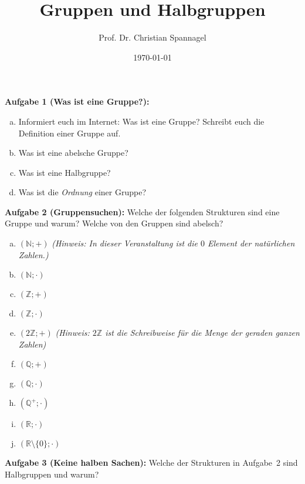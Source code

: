 \documentclass{../cssheet}
\title{Gruppen und Halbgruppen}
\author{Prof. Dr. Christian Spannagel}
\date{\today}
\begin{document}
\printtitle

\vspace*{10mm}

\textbf{Aufgabe 1 (Was ist eine Gruppe?):} 
\begin{enumerate}[a)]
\item Informiert euch im Internet: Was ist eine Gruppe? Schreibt euch die Definition einer Gruppe auf. 
\item Was ist eine abelsche Gruppe?
\item Was ist eine Halbgruppe?
\item Was ist die \emph{Ordnung} einer Gruppe?
\end{enumerate}

\textbf{Aufgabe 2 (Gruppensuchen):} Welche der folgenden Strukturen sind eine Gruppe und warum? Welche von den Gruppen sind abelsch?

\begin{enumerate}[a)]
\item $(\mathbb{N}; +)$ \emph{(Hinweis: In dieser Veranstaltung ist die $0$ Element der natürlichen Zahlen.)}
\item $(\mathbb{N}; \cdot)$
\item $(\mathbb{Z}; +)$
\item $(\mathbb{Z}; \cdot)$
\item $(2\mathbb{Z}; +)$ \emph{(Hinweis: $2\mathbb{Z}$ ist die Schreibweise für die Menge der geraden ganzen Zahlen)}
\item $(\mathbb{Q}; +)$
\item $(\mathbb{Q}; \cdot)$
\item $(\mathbb{Q}^{+}; \cdot)$
\item $(\mathbb{R}; \cdot)$
\item $(\mathbb{R}\setminus\{0\}; \cdot)$
\end{enumerate}

\textbf{Aufgabe 3 (Keine halben Sachen):} Welche der Strukturen in Aufgabe~2 sind Halbgruppen und warum?


\vspace*{2cm}
\printlicense

\printsocials
\end{document}
